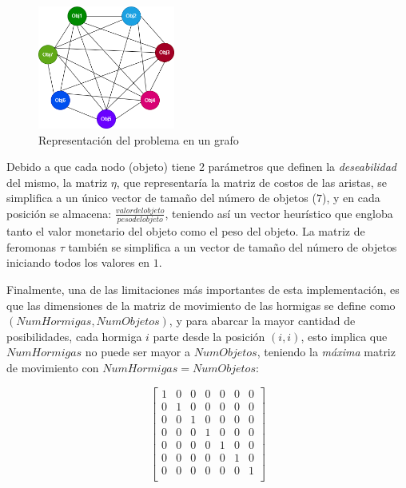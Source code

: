 \documentclass[12pt, a4paper]{article}
\begin{document}
\begin{figure}
    \centering
    \includegraphics[width=0.4\textwidth]{img/grafo.png}
    \caption{Representación del problema en un grafo}
\end{figure}

Debido a que cada nodo (objeto) tiene 2 parámetros que definen la \emph{deseabilidad} del mismo, la matriz $\eta$, que representaría la matriz de costos de las aristas, se simplifica a un único vector de tamaño del número de objetos ($7$), y en cada posición se almacena: $\frac{valor del objeto}{peso del objeto}$, teniendo así un vector heurístico que engloba tanto el valor monetario del objeto como el peso del objeto. La matriz de feromonas $\tau$ también se simplifica a un vector de tamaño del número de objetos iniciando todos los valores en $1$.

Finalmente, una de las limitaciones más importantes de esta implementación, es que las dimensiones de la matriz de movimiento de las hormigas se define como $(NumHormigas,NumObjetos)$, y para abarcar la mayor cantidad de posibilidades, cada hormiga $i$ parte desde la posición $(i,i)$, esto implica que $NumHormigas$ no puede ser mayor a $NumObjetos$, teniendo la \emph{máxima} matriz de movimiento con $NumHormigas=NumObjetos$:

\begin{equation}
    \begin{bmatrix}
        1 & 0 & 0 & 0 & 0 & 0 & 0 \\
        0 & 1 & 0 & 0 & 0 & 0 & 0 \\
        0 & 0 & 1 & 0 & 0 & 0 & 0 \\
        0 & 0 & 0 & 1 & 0 & 0 & 0 \\
        0 & 0 & 0 & 0 & 1 & 0 & 0 \\
        0 & 0 & 0 & 0 & 0 & 1 & 0 \\
        0 & 0 & 0 & 0 & 0 & 0 & 1 \\
    \end{bmatrix}
\end{equation}
\end{document}
